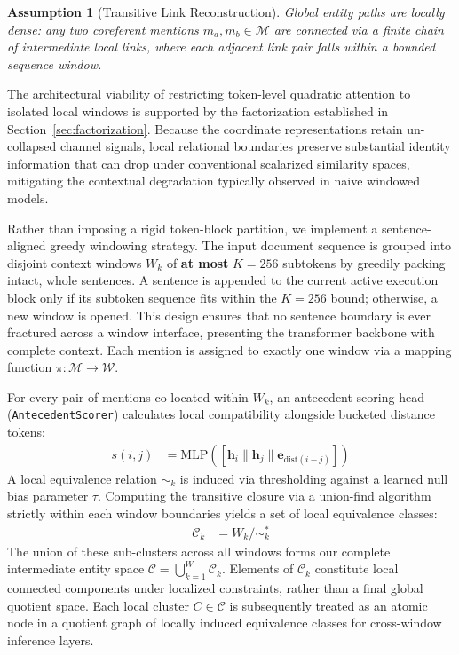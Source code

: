 \documentclass[12pt]{article}
\newtheorem{assumption}{Assumption}
\begin{document}
	\begin{assumption}[Transitive Link Reconstruction]
		Global entity paths are locally dense: any two coreferent mentions $m_a, m_b \in \mathcal{M}$ are connected via a finite chain of intermediate local links, where each adjacent link pair falls within a bounded sequence window.
	\end{assumption}
	
	The architectural viability of restricting token-level quadratic attention to isolated local windows is supported by the factorization established in Section~\ref{sec:factorization}. Because the coordinate representations retain un-collapsed channel signals, local relational boundaries preserve substantial identity information that can drop under conventional scalarized similarity spaces, mitigating the contextual degradation typically observed in naive windowed models.
	
	Rather than imposing a rigid token-block partition, we implement a sentence-aligned greedy windowing strategy. The input document sequence is grouped into disjoint context windows $W_k$ of \textbf{at most} $K=256$ subtokens by greedily packing intact, whole sentences. A sentence is appended to the current active execution block only if its subtoken sequence fits within the $K=256$ bound; otherwise, a new window is opened. This design ensures that no sentence boundary is ever fractured across a window interface, presenting the transformer backbone with complete context. Each mention is assigned to exactly one window via a mapping function $\pi: \mathcal{M} \rightarrow \mathcal{W}$.
	
	For every pair of mentions co-located within $W_k$, an antecedent scoring head (\texttt{AntecedentScorer}) calculates local compatibility alongside bucketed distance tokens:
	\begin{align*}
		s(i, j) &= \text{MLP}\left([\mathbf{h}_i \parallel \mathbf{h}_j \parallel \mathbf{e}_{\text{dist}(i-j)}]\right)
	\end{align*}
	A local equivalence relation $\sim_k$ is induced via thresholding against a learned null bias parameter $\tau$. Computing the transitive closure via a union-find algorithm strictly within each window boundaries yields a set of local equivalence classes:
	\begin{align*}
		\mathcal{C}_k &= W_k / \sim_k^*
	\end{align*}
	The union of these sub-clusters across all windows forms our complete intermediate entity space $\mathcal{C} = \bigcup_{k=1}^{W} \mathcal{C}_k$. Elements of $\mathcal{C}_k$ constitute local connected components under localized constraints, rather than a final global quotient space. Each local cluster $C \in \mathcal{C}$ is subsequently treated as an atomic node in a quotient graph of locally induced equivalence classes for cross-window inference layers.
	
\end{document}
